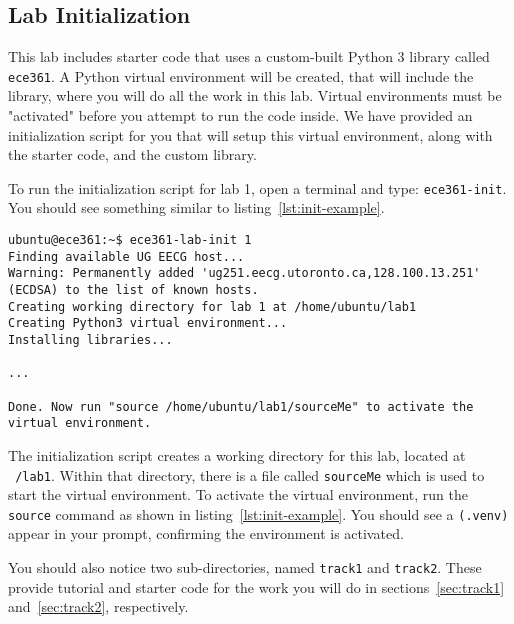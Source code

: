 \documentclass[11pt]{article}
\begin{document}
\subsection{Lab Initialization}
\label{subsec:lab-init}
This lab includes starter code that uses a custom-built Python 3 library called \texttt{ece361}. A Python virtual environment will be created, that will include the library, where you will do all the work in this lab. Virtual environments must be "activated" before you attempt to run the code inside. We have provided an initialization script for you that will setup this virtual environment, along with the starter code, and the custom library.


To run the initialization script for lab 1, open a terminal and type: \texttt{ece361-init}. You should see something similar to listing~\ref{lst:init-example}.
\begin{lstlisting}[style=ece361shell, caption={Initializing lab 1}, label={lst:init-example}]
ubuntu@ece361:~$ ece361-lab-init 1
Finding available UG EECG host...
Warning: Permanently added 'ug251.eecg.utoronto.ca,128.100.13.251' (ECDSA) to the list of known hosts.
Creating working directory for lab 1 at /home/ubuntu/lab1
Creating Python3 virtual environment...
Installing libraries...

...

Done. Now run "source /home/ubuntu/lab1/sourceMe" to activate the virtual environment.
\end{lstlisting}

The initialization script creates a working directory for this lab, located at \texttt{~/lab1}. Within that directory, there is a file called \texttt{sourceMe} which is used to start the virtual environment. To activate the virtual environment, run the \texttt{source} command as shown in listing~\ref{lst:init-example}. You should see a \texttt{(.venv)} appear in your prompt, confirming the environment is activated.

You should also notice two sub-directories, named \texttt{track1} and \texttt{track2}. These provide tutorial and starter code for the work you will do in sections~\ref{sec:track1} and~\ref{sec:track2}, respectively.
\end{document}
